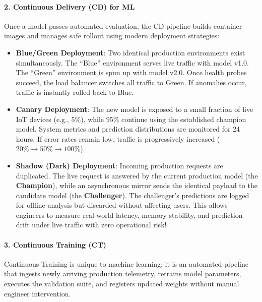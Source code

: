\paragraph{2. Continuous Delivery (CD) for ML}
Once a model passes automated evaluation, the CD pipeline builds container images and manages safe rollout using modern deployment strategies:
\begin{itemize}
    \item \textbf{Blue/Green Deployment}: Two identical production environments exist simultaneously. The ``Blue'' environment serves live traffic with model v1.0. The ``Green'' environment is spun up with model v2.0. Once health probes succeed, the load balancer switches all traffic to Green. If anomalies occur, traffic is instantly rolled back to Blue.
    \item \textbf{Canary Deployment}: The new model is exposed to a small fraction of live IoT devices (e.g., $5\%$), while $95\%$ continue using the established champion model. System metrics and prediction distributions are monitored for 24 hours. If error rates remain low, traffic is progressively increased ($20\% \to 50\% \to 100\%$).
    \item \textbf{Shadow (Dark) Deployment}: Incoming production requests are duplicated. The live request is answered by the current production model (the \textbf{Champion}), while an asynchronous mirror sends the identical payload to the candidate model (the \textbf{Challenger}). The challenger's predictions are logged for offline analysis but discarded without affecting users. This allows engineers to measure real-world latency, memory stability, and prediction drift under live traffic with zero operational risk!
\end{itemize}

\paragraph{3. Continuous Training (CT)}
Continuous Training is unique to machine learning: it is an automated pipeline that ingests newly arriving production telemetry, retrains model parameters, executes the validation suite, and registers updated weights without manual engineer intervention.

